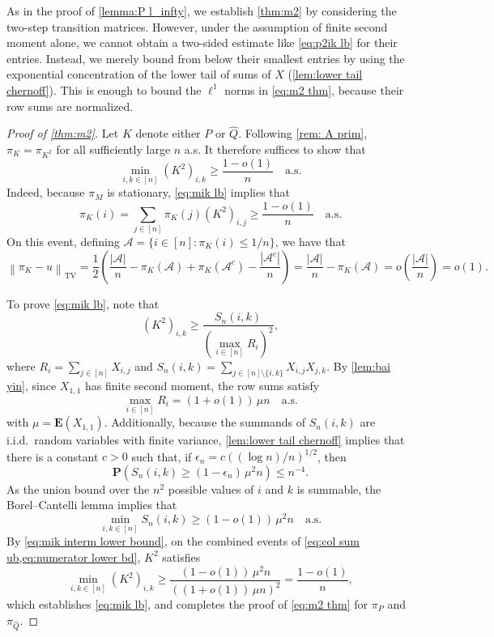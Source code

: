\documentclass[12pt]{amsart}
\newcommand\wh[1]{\widehat{#1}}
\renewcommand{\P}{\mathbf{P}}
\newcommand{\E}{\mathbf{E}}
\DeclareMathOperator{\1}{\mathbf{1}}
\newcommand{\eps}{\epsilon}
\begin{document}
As in the proof of \cref{lemma:P l_infty}, we establish \cref{thm:m2} by considering the two-step transition matrices. However, under the assumption of finite second moment alone, we cannot obtain a two-sided estimate like \cref{eq:p2ik lb} for their entries. Instead, we merely bound from below their smallest entries by using the exponential concentration of the lower tail of sums of $X$ (\cref{lem:lower tail chernoff}). This is enough to bound the $\ell^1$ norms in \cref{eq:m2 thm}, because their row sums are normalized.

\begin{proof}[Proof of \cref{thm:m2}]

Let $K$ denote either $P$ or $\wh{Q}$. Following \cref{rem: A prim}, $\pi_K = \pi_{K^2}$ for all sufficiently large $n$ a.s. It therefore suffices to show that
\begin{equation}\label{eq:mik lb}
	\min_{i,k \in [n]} (K^2)_{i,k} \geq \frac{1 - o(1)}{n} \quad \mathrm{a.s.}
\end{equation}
Indeed, because $\pi_{M}$ is stationary, \cref{eq:mik lb} implies that
\[
	\pi_{K} (i) = \sum_{j \in [n]} \pi_{K} (j) (K^2)_{i,j} \geq \frac{1 - o(1)}{n} \quad \mathrm{a.s.}
\]
On this event, defining $\mathcal{A} = \{i \in [n]: \pi_{K} (i) \leq 1/n\}$, we have that
\[
\left\| \pi_{K} - u \right\|_{\mathrm{TV}} = \frac12 \left(\frac{|\mathcal{A}|}{n} - \pi_{K} (\mathcal{A}) + \pi_{K} (\mathcal{A}^c) - \frac{|\mathcal{A}^c|}{n}\right) = \frac{|\mathcal{A}|}{n} - \pi_{K} (\mathcal{A}) = o \left( \frac{|\mathcal{A}|}{n} \right) = o(1).
\]

To prove \cref{eq:mik lb}, note that
\begin{equation}\label{eq:mik interm lower bound}
	(K^2)_{i,k} \geq \frac{S_n (i,k)}{(\max_{i \in [n]} R_i)^2},
\end{equation}
where $R_i = \sum_{j \in [n]} X_{i,j}$ and $S_n (i,k) = \sum_{j \in [n]\setminus\{i,k\}} X_{i,j} X_{j,k}$. By \cref{lem:bai yin}, since $X_{1,1}$ has finite second moment, the row sums satisfy
\begin{equation}\label{eq:col sum ub}
	\max_{i \in [n]} R_i = (1 + o(1))\, \mu n \quad \mathrm{a.s.}
\end{equation} 
with $\mu = \E(X_{1,1})$. Additionally, because the summands of $S_n (i,k)$ are i.i.d.\ random variables with finite variance, \cref{lem:lower tail chernoff} implies that there is a constant $c > 0$ such that, if $\eps_n = c( (\log n)/n )^{1/2}$, then
\[
	\P ( S_n (i,k) \geq (1-\eps_n)\, \mu^2 n ) \leq n^{-4}.
\]
As the union bound over the $n^2$ possible values of $i$ and $k$ is summable, the Borel--Cantelli lemma implies that 
\begin{equation}\label{eq:numerator lower bd}
	\min_{i,k \in [n]} S_n (i,k) \geq (1 - o(1))\, \mu^2 n \quad \mathrm{a.s.}
\end{equation}
By \cref{eq:mik interm lower bound}, on the combined events of \cref{eq:col sum ub,eq:numerator lower bd}, $K^2$ satisfies
\[
	\min_{i,k \in [n]} (K^2)_{i,k} \geq \frac{(1-o(1))\, \mu^2 n}{((1+o(1))\, \mu n)^2} = \frac{1-o(1)}{n},
\]
which establishes \cref{eq:mik lb}, and completes the proof of \cref{eq:m2 thm} for $\pi_P$ and $\pi_{\wh{Q}}$.


\end{proof}
\end{document}
